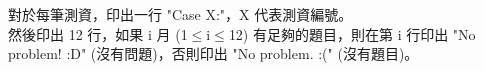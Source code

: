 對於每筆測資，印出一行 "Case X:"，X 代表測資編號。\\
然後印出 12 行，如果 i 月 (1$\leq$i$\leq$12) 有足夠的題目，則在第 i 行印出 "No problem! :D" (沒有問題)，否則印出 "No problem. :(" (沒有題目)。\\
